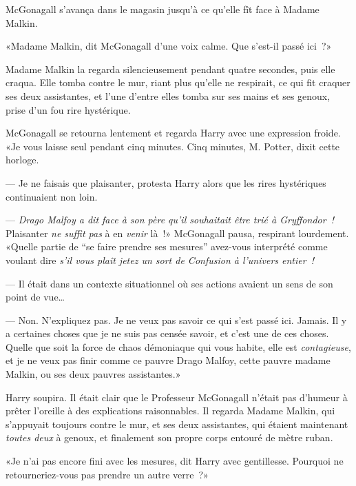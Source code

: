 McGonagall s'avança dans le magasin jusqu'à ce qu'elle fît face à Madame Malkin.

«Madame Malkin, dit McGonagall d'une voix calme. Que s'est-il passé ici~?»

Madame Malkin la regarda silencieusement pendant quatre secondes, puis elle craqua. Elle tomba contre le mur, riant plus qu'elle ne respirait, ce qui fit craquer ses deux assistantes, et l'une d'entre elles tomba sur ses mains et ses genoux, prise d'un fou rire hystérique.

McGonagall se retourna lentement et regarda Harry avec une expression froide.
«Je vous laisse seul pendant cinq minutes. Cinq minutes, M. Potter, dixit cette horloge.

--- Je ne faisais que plaisanter, protesta Harry alors que les rires hystériques continuaient non loin.

--- \emph{Drago Malfoy a dit face à son père qu'il souhaitait être trié à Gryffondor~!} Plaisanter \emph{ne suffit pas} à en \emph{venir} là~!» McGonagall pausa, respirant lourdement. «Quelle partie de “se faire prendre ses mesures” avez-vous interprété comme voulant dire \emph{s'il vous plaît jetez un sort de Confusion à l'univers entier~!}

--- Il était dans un contexte situationnel où ses actions avaient un sens de son point de vue…

--- Non. N'expliquez pas. Je ne veux pas savoir ce qui s'est passé ici. Jamais. Il y a certaines choses que je ne suis pas censée savoir, et c'est une de ces choses. Quelle que soit la force de chaos démoniaque qui vous habite, elle est \emph{contagieuse}, et je ne veux pas finir comme ce pauvre Drago Malfoy, cette pauvre madame Malkin, ou ses deux pauvres assistantes.»

Harry soupira. Il était clair que le Professeur McGonagall n'était pas d'humeur à prêter l'oreille à des explications raisonnables. Il regarda Madame Malkin, qui s'appuyait toujours contre le mur, et ses deux assistantes, qui étaient maintenant \emph{toutes deux} à genoux, et finalement son propre corps entouré de mètre ruban.

«Je n'ai pas encore fini avec les mesures, dit Harry avec gentillesse. Pourquoi ne retourneriez-vous pas prendre un autre verre~?»

